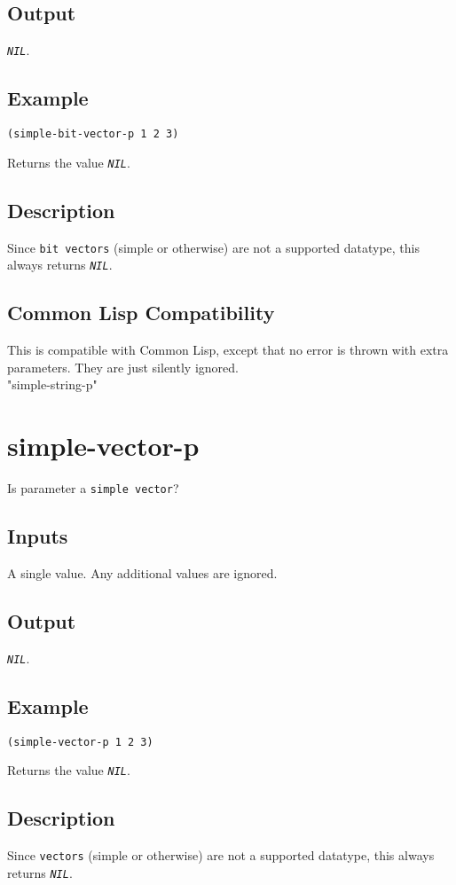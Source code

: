 \documentclass[10pt, openany]{book}
\newcommand{\constant}[1]{\emph{\texttt{#1}}}
\newcommand{\datatype}[1]{\texttt{#1}}
\newcommand{\cl}{Common Lisp}
\begin{document}
\subsection{Output}
\constant{NIL}.
\subsection{Example}
\begin{lstlisting}
(simple-bit-vector-p 1 2 3)
\end{lstlisting}
Returns the value \constant{NIL}.
\subsection{Description}
Since \datatype{bit vectors} (simple or otherwise) are not a supported datatype, this always returns \constant{NIL}.
\subsection{Common Lisp Compatibility}
This is compatible with \cl, except that no error is thrown with extra parameters.  They are just silently ignored.
\\
      "simple-string-p"\\

\section{simple-vector-p}
Is parameter a \datatype{simple vector}?
\subsection{Inputs}
A single value.  Any additional values are ignored.
\subsection{Output}
\constant{NIL}.
\subsection{Example}
\begin{lstlisting}
(simple-vector-p 1 2 3)
\end{lstlisting}
Returns the value \constant{NIL}.
\subsection{Description}
Since \datatype{vectors} (simple or otherwise) are not a supported datatype, this always returns \constant{NIL}.
\end{document}
